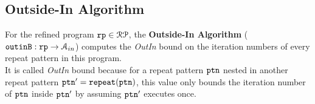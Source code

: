 \subsection{Outside-In Algorithm}
\label{sec:outinalg}
For the refined program $\mathtt{rp} \in \mathcal{RP}$, the \textbf{Outside-In Algorithm} ($\mathtt{outinB}: \mathtt{rp} \to \mathcal{A}_{in}$)
computes the \emph{OutIn} bound on the iteration numbers of every repeat pattern in this program.
\\
It is called \emph{OutIn} bound because for a repeat pattern $\mathtt{ptn}$ nested
in another repeat pattern $\mathtt{ptn}' = \mathtt{repeat}(\mathtt{ptn})$,
this value only bounds the iteration number of $\mathtt{ptn}$ inside $\mathtt{ptn}'$ by assuming $\mathtt{ptn}'$ executes once.


